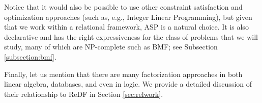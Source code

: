 Notice that it would also be possible to use other constraint satisfaction and optimization approaches
(such as, e.g., Integer Linear Programming), but given that we work within a relational framework, ASP is a natural choice. It is also declarative and has the right expressiveness for the class of problems that we will study, many of which are NP-complete such as BMF; see Subsection \ref{subsection:bmf}. 

Finally, let us mention that there are many factorization approaches in both linear algebra, databases, and even in logic. We provide a detailed discussion of their relationship to ReDF in Section \ref{sec:relwork}.






